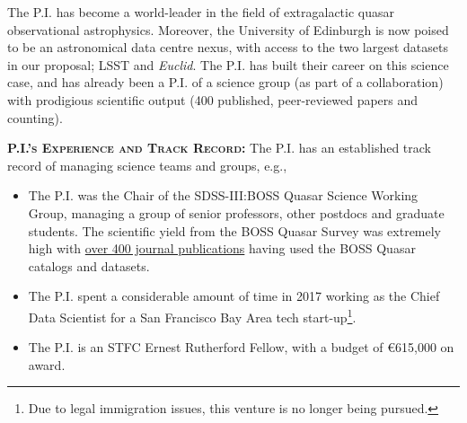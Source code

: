 \documentclass[oneside, a4paper, onecolumn, 11pt]{article}
\begin{document}
\smallskip
\smallskip
\noindent
The P.I. has become a world-leader in the field of extragalactic
quasar observational astrophysics.  Moreover, the University of
Edinburgh is now poised to be an astronomical data centre nexus, with
access to the two largest datasets in our proposal; LSST and {\it
Euclid}.  The P.I. has built their career on this science case, and
has already been a P.I.  of a science group (as part of a
collaboration) with prodigious scientific output (400 published,
peer-reviewed papers and counting).


\smallskip
\smallskip
\noindent
\textbf{\textsc{P.I.'s Experience and Track Record:}}
The P.I. has an established track record of managing science teams and groups, e.g., 

\begin{itemize}
\item The P.I. was the Chair
of the SDSS-III:BOSS Quasar Science Working Group, managing a
group of senior professors, other postdocs and graduate students.
The scientific yield from the BOSS Quasar Survey was extremely high 
with \href{https://tinyurl.com/ycxd8lb6}{over 400 journal publications} having 
used the BOSS Quasar catalogs and datasets.

\item The P.I. spent a considerable amount of time in 2017 working as the
Chief Data Scientist for a San Francisco Bay Area 
tech start-up\footnote{Due to legal immigration issues, this venture is no longer being pursued.}. 

\item The P.I. is an STFC Ernest Rutherford Fellow, with a budget of \euro615,000 on award. 
\end{itemize}
\end{document}
